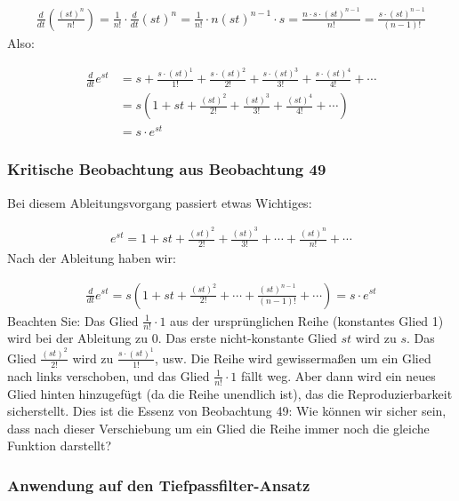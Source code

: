 \documentclass[a4paper,12pt,twoside]{report}
\theoremstyle{definition}
\begin{document}
\begin{align}
	\frac{d}{dt}\left(\frac{(st)^n}{n!}\right) = \frac{1}{n!} \cdot \frac{d}{dt}(st)^n = \frac{1}{n!} \cdot n(st)^{n-1} \cdot s = \frac{n \cdot s \cdot (st)^{n-1}}{n!} = \frac{s \cdot (st)^{n-1}}{(n-1)!}
\end{align}
Also:

\begin{align}
	\frac{d}{dt} e^{st} &= s + \frac{s \cdot (st)^1}{1!} + \frac{s \cdot (st)^2}{2!} + \frac{s \cdot (st)^3}{3!} + \frac{s \cdot (st)^4}{4!} + \cdots\\
	&= s \left( 1 + st + \frac{(st)^2}{2!} + \frac{(st)^3}{3!} + \frac{(st)^4}{4!} + \cdots \right)\\
	&= s \cdot e^{st}
\end{align}

\subsubsection*{Kritische Beobachtung aus Beobachtung 49}

Bei diesem Ableitungsvorgang passiert etwas Wichtiges: 

\begin{align}
	e^{st} = 1 + st + \frac{(st)^2}{2!} + \frac{(st)^3}{3!} + \cdots + \frac{(st)^n}{n!} + \cdots
\end{align}
Nach der Ableitung haben wir:

\begin{align}
	\frac{d}{dt} e^{st} = s \left( 1 + st + \frac{(st)^2}{2!} + \cdots + \frac{(st)^{n-1}}{(n-1)!} + \cdots \right) = s \cdot e^{st}
\end{align}
Beachten Sie: Das Glied $\frac{1}{n!} \cdot 1$ aus der ursprünglichen Reihe (konstantes Glied 1) wird bei der Ableitung zu 0. Das erste nicht-konstante Glied $st$ wird zu $s$. Das Glied $\frac{(st)^2}{2!}$ wird zu $\frac{s \cdot (st)^1}{1!}$, usw.
Die Reihe wird gewissermaßen um ein Glied nach links verschoben, und das Glied $\frac{1}{n!} \cdot 1$ fällt weg. Aber dann wird ein neues Glied hinten hinzugefügt (da die Reihe unendlich ist), das die Reproduzierbarkeit sicherstellt.
Dies ist die Essenz von Beobachtung 49: Wie können wir sicher sein, dass nach dieser Verschiebung um ein Glied die Reihe immer noch die gleiche Funktion darstellt?

\subsubsection*{Anwendung auf den Tiefpassfilter-Ansatz}
\end{document}
